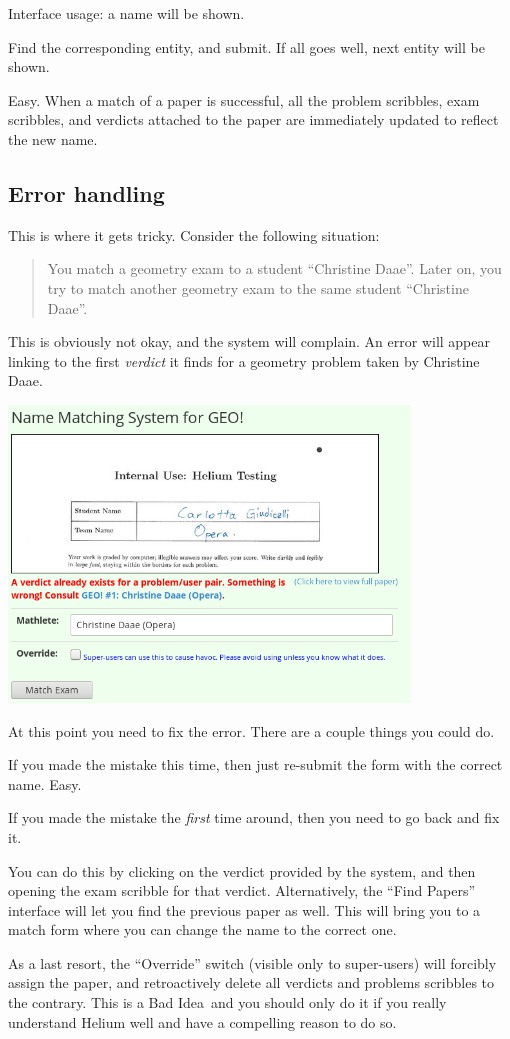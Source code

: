 Interface usage: a name will be shown.
\begin{itemize}
	\ii Find the corresponding entity, and submit.
	\ii If all goes well, next entity will be shown.
\end{itemize}
Easy.
When a match of a paper is successful,
all the problem scribbles, exam scribbles, and verdicts
attached to the paper are immediately updated to reflect the new name.

\subsection{Error handling}
This is where it gets tricky.
Consider the following situation:
\begin{quote}
	You match a geometry exam to a student ``Christine Daae''.  
	Later on, you try to match another geometry exam
	to the same student ``Christine Daae''.
\end{quote}
This is obviously not okay, and the system will complain.
An error will appear linking to the first \emph{verdict}
it finds for a geometry problem taken by Christine Daae.

\begin{center}
	\includegraphics[width=0.8\textwidth]{images/matchconflict.png}
\end{center}


At this point you need to fix the error.
There are a couple things you could do.
\begin{itemize}
	\ii If you made the mistake this time,
	then just re-submit the form with the correct name. Easy.

	\ii If you made the mistake the \emph{first} time around,
	then you need to go back and fix it.

	You can do this by clicking on the verdict provided by the system,
	and then opening the exam scribble for that verdict.
	Alternatively, the ``Find Papers'' interface will let you find
	the previous paper as well.
	This will bring you to a match form where you can change the
	name to the correct one.

	\ii As a last resort,
	the ``Override'' switch (visible only to super-users)
	will forcibly assign the paper,
	and retroactively delete all verdicts and
	problems scribbles to the contrary.
	This is a Bad Idea\texttrademark\ and you should only do it
	if you really understand Helium well and have a compelling reason to do so.
\end{itemize}

